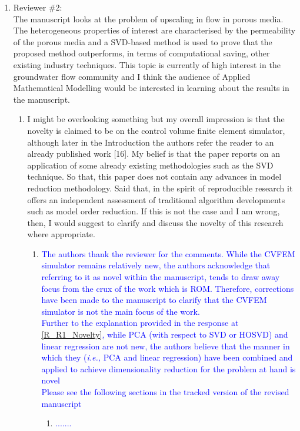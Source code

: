 \documentclass[11pt]{letter} %
\newcommand{\blue}{\textcolor{blue}}
\newcommand{\ie}{{\it i.e., }}
\begin{document}
\begin{letter}
{\begin{enumerate}
\item Reviewer \#2: \\
  The manuscript looks at the problem of upscaling in flow in porous media. The heterogeneous properties of interest are characterised by the permeability of the porous media and a SVD-based method is used to prove that the proposed method outperforms, in terms of computational saving, other existing industry techniques. This topic is currently of high interest in the groundwater flow community and I think the audience of Applied Mathematical Modelling would be interested in learning about the results in the manuscript.
  \begin{enumerate}
  \item \label{R_R2_Novelty} I might be overlooking something but my overall impression is that the novelty is claimed to be on the control volume finite element simulator, although later in the Introduction the authors refer the reader to an already published work [16]. My belief is that the paper reports on an application of some already existing methodologies such as the SVD technique. So that, this paper does not contain any advances in model reduction methodology. Said that, in the spirit of reproducible research it offers an independent assessment of traditional algorithm developments such as model order reduction. If this is not the case and I am wrong, then, I would suggest to clarify and discuss the novelty of this research where appropriate.
    \begin{enumerate}
      \item \label{R_R2_Novelty_1} \blue{The authors thank the reviewer for the comments. While the CVFEM simulator remains relatively new, the authors acknowledge that referring to it as novel within the manuscript, tends to draw away focus from the crux of the work which is ROM. Therefore, corrections have been made to the manuscript to clarify that the CVFEM simulator is not the main focus of the work.\\
        Further to the explanation provided in the response at \ref{R_R1_Novelty}, while PCA (with respect to SVD or HOSVD) and linear regression are not new, the authors believe that the manner in which they (\ie PCA and linear regression) have been combined and applied to achieve dimensionality reduction for the problem at hand is novel}\\
        \blue{Please see the following sections in the tracked version of the revised manuscript}
   \begin{enumerate}
 \item \blue{.......}

\end{enumerate}
\end{enumerate}
\end{enumerate}
\end{enumerate}}
\end{letter}
\end{document}
